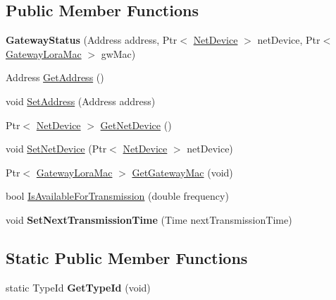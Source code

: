 \subsection*{Public Member Functions}
\begin{DoxyCompactItemize}
\item 
\mbox{\label{classns3_1_1lorawan_1_1GatewayStatus_ade11dac71387dc888833792d271a38ff}} 
{\bfseries Gateway\+Status} (Address address, Ptr$<$ \hyperlink{classNetDevice}{Net\+Device} $>$ net\+Device, Ptr$<$ \hyperlink{classns3_1_1lorawan_1_1GatewayLoraMac}{Gateway\+Lora\+Mac} $>$ gw\+Mac)
\item 
Address \hyperlink{classns3_1_1lorawan_1_1GatewayStatus_a0f90d708d60a10dcc768a1c84c995c0b}{Get\+Address} ()
\item 
void \hyperlink{classns3_1_1lorawan_1_1GatewayStatus_a073a26dbdcc6431a11ea774697925b1c}{Set\+Address} (Address address)
\item 
Ptr$<$ \hyperlink{classNetDevice}{Net\+Device} $>$ \hyperlink{classns3_1_1lorawan_1_1GatewayStatus_aaa7bdf07df771a98645d54d54144f4c2}{Get\+Net\+Device} ()
\item 
void \hyperlink{classns3_1_1lorawan_1_1GatewayStatus_af491570545959a7b8f1d0bb7228d520d}{Set\+Net\+Device} (Ptr$<$ \hyperlink{classNetDevice}{Net\+Device} $>$ net\+Device)
\item 
Ptr$<$ \hyperlink{classns3_1_1lorawan_1_1GatewayLoraMac}{Gateway\+Lora\+Mac} $>$ \hyperlink{classns3_1_1lorawan_1_1GatewayStatus_a4fb9662e38bf1007768dcebd033933a5}{Get\+Gateway\+Mac} (void)
\item 
bool \hyperlink{classns3_1_1lorawan_1_1GatewayStatus_a09aa68088ae7a91f6c215742eb2e5e6b}{Is\+Available\+For\+Transmission} (double frequency)
\item 
\mbox{\label{classns3_1_1lorawan_1_1GatewayStatus_a5d3fd8f38c9ce48b3e3403fa72671723}} 
void {\bfseries Set\+Next\+Transmission\+Time} (Time next\+Transmission\+Time)
\end{DoxyCompactItemize}
\subsection*{Static Public Member Functions}
\begin{DoxyCompactItemize}
\item 
\mbox{\label{classns3_1_1lorawan_1_1GatewayStatus_a6e5beb75a9fde3f3cdc6f2fcec830b48}} 
static Type\+Id {\bfseries Get\+Type\+Id} (void)
\end{DoxyCompactItemize}


